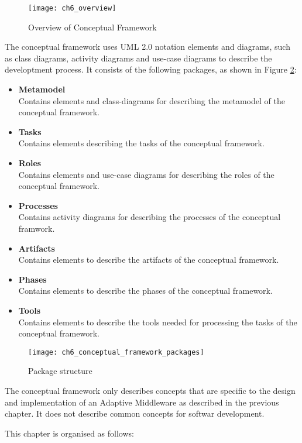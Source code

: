 \begin{figure}
	[htpb] \centering 
	\texttt{[image: ch6\_overview]} \caption{Overview of Conceptual Framework} \label{fig:ch6_overview} 
\end{figure}

The conceptual framework uses \ac{UML} 2.0 notation elements and diagrams, such as class diagrams, activity diagrams and use-case diagrams to describe the developtment process. It consists of the following packages, as shown in Figure \ref{fig:ch6_packages}:
\begin{itemize}
	\item \textbf{Metamodel}\\
	Contains elements and class-diagrams for describing the metamodel of the conceptual framework.
	\item \textbf{Tasks}\\
	Contains elements describing the tasks of the conceptual framework.
	\item \textbf{Roles}\\
	Contains elements and use-case diagrams for describing the roles of the conceptual framework.
	\item \textbf{Processes}\\
	Contains activity diagrams for describing the processes of the conceptual framwork.
	\item \textbf{Artifacts}\\
	Contains elements to describe the artifacts of the conceptual framework.
	\item \textbf{Phases}\\
	Contains elements to describe the phases of the conceptual framework.
	\item \textbf{Tools}\\
	Contains elements to describe the tools needed for processing the tasks of the conceptual framework.
\end{itemize}

\begin{figure}
	[htpb] \centering 
	\texttt{[image: ch6\_conceptual\_framework\_packages]} \caption{Package structure} \label{fig:ch6_packages} 
\end{figure}

The conceptual framework only describes concepts that are specific to the design and implementation of an Adaptive Middleware as described in the previous chapter. It does not describe common concepts for softwar development.

This chapter is organised as follows:

